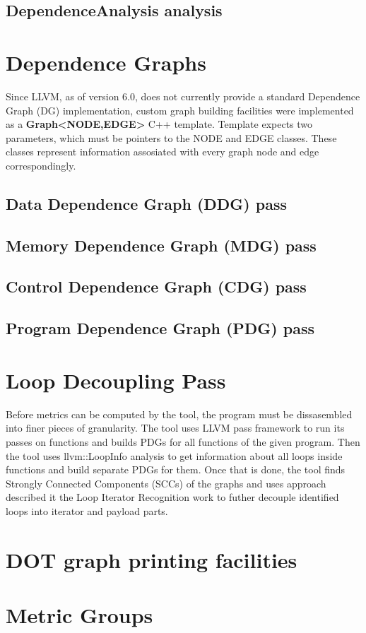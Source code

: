 \subsection{DependenceAnalysis analysis}

\section{Dependence Graphs}
\qquad Since LLVM, as of version 6.0, does not currently provide a standard Dependence Graph (DG) implementation, custom graph building facilities were implemented as a \textbf{Graph\textless \textsc{NODE},\textsc{EDGE}\textgreater} C++ template. Template expects two parameters, which must be pointers to the NODE and EDGE classes. These classes represent information assosiated with every graph node and edge correspondingly.   

\subsection{Data Dependence Graph (DDG) pass}

\subsection{Memory Dependence Graph (MDG) pass}

\subsection{Control Dependence Graph (CDG) pass}

\subsection{Program Dependence Graph (PDG) pass}

\section{Loop Decoupling Pass}
\qquad Before metrics can be computed by the tool, the program must be dissasembled into finer pieces of granularity. The tool uses LLVM pass framework to run its passes on functions and builds PDGs for all functions of the given program. Then the tool uses llvm::LoopInfo analysis to get information about all loops inside functions and build separate PDGs for them. Once that is done, the tool finds Strongly Connected Components (SCCs) of the graphs and uses approach described it the Loop Iterator Recognition work \cite{iterator-recognition} to futher decouple identified loops into iterator and payload parts.          

\section{DOT graph printing facilities} 

\section{Metric Groups}